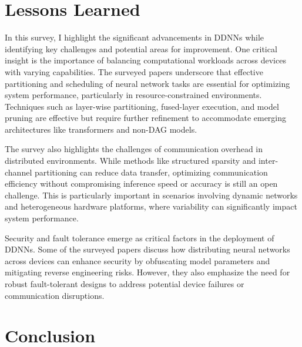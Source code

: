 \documentclass[conference]{IEEEtran}
\begin{document}




\section{Lessons Learned}

In this survey, I highlight the significant advancements in DDNNs while identifying key challenges and potential areas for improvement. One critical insight is the importance of balancing computational workloads across devices with varying capabilities. The surveyed papers underscore that effective partitioning and scheduling of neural network tasks are essential for optimizing system performance, particularly in resource-constrained environments. Techniques such as layer-wise partitioning, fused-layer execution, and model pruning are effective but require further refinement to accommodate emerging architectures like transformers and non-DAG models.

The survey also highlights the challenges of communication overhead in distributed environments. While methods like structured sparsity and inter-channel partitioning can reduce data transfer, optimizing communication efficiency without compromising inference speed or accuracy is still an open challenge. This is particularly important in scenarios involving dynamic networks and heterogeneous hardware platforms, where variability can significantly impact system performance.

Security and fault tolerance emerge as critical factors in the deployment of DDNNs. Some of the surveyed papers discuss how distributing neural networks across devices can enhance security by obfuscating model parameters and mitigating reverse engineering risks. However, they also emphasize the need for robust fault-tolerant designs to address potential device failures or communication disruptions.



\section{Conclusion}
\end{document}

